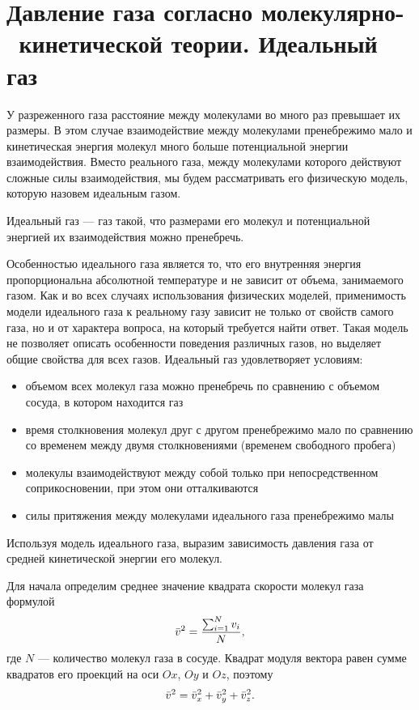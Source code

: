 \section{Давление газа согласно молекулярно- \, кинетической теории. Идеальный газ}

	У разреженного газа расстояние между молекулами во много раз превышает их размеры. В этом случае взаимодействие между молекулами пренебрежимо мало и кинетическая энергия молекул много больше потенциальной энергии взаимодействия. Вместо реального газа, между молекулами которого действуют сложные силы взаимодействия, мы будем рассматривать его физическую модель, которую назовем идеальным газом. 
	\begin{defn}
		Идеальный газ --- газ такой, что размерами его молекул и потенциальной энергией их взаимодействия можно пренебречь.
	\end{defn}
	Особенностью идеального газа является то, что его внутренняя энергия пропорциональна абсолютной температуре и не зависит от объема, занимаемого газом. Как и во всех случаях использования физических моделей, применимость модели идеального газа к реальному газу зависит не только от свойств самого газа, но и от характера вопроса, на который требуется найти ответ. Такая модель не позволяет описать особенности поведения различных газов, но выделяет общие свойства для всех газов. Идеальный газ удовлетворяет условиям:
	\begin{itemize}
		\item объемом всех молекул газа можно пренебречь по сравнению с объемом сосуда, в котором находится газ
		\item время столкновения молекул друг с другом пренебрежимо мало по сравнению со временем между двумя столкновениями (временем свободного пробега)
		\item молекулы взаимодействуют между собой только при непосредственном соприкосновении, при этом они отталкиваются
		\item силы притяжения между молекулами идеального газа пренебрежимо малы
	\end{itemize}
	Используя модель идеального газа, выразим зависимость давления газа от средней кинетической энергии его молекул.\par
	Для начала определим среднее значение квадрата скорости молекул газа формулой
		$$\bar v^2=\frac{\sum_{i=1}^N v_i}{N},$$ 
	где $N$ --- количество молекул газа в сосуде. Квадрат модуля вектора равен сумме квадратов его проекций на оси $Ox$, $Oy$ и $Oz$, поэтому
		$$\bar v^2=\bar v_x^2+\bar v_y^2+\bar v_z^2.$$
